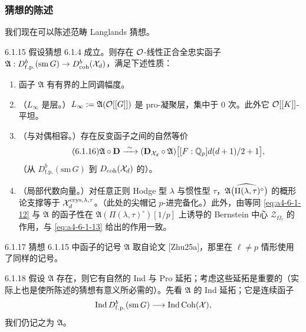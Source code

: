 \subsubsection{猜想的陈述}
我们现在可以陈述范畴 Langlands 猜想。

\begin{conj}{6.1.15}\label{thm:a4-6-1-15}
假设猜想 6.1.4 成立。则存在 $\mathcal{O}$-线性正合全忠实函子 $\mathfrak{A}:D^b_{\mathrm{f.p.}}(\mathrm{sm}\,G)\to D^b_{\mathrm{coh}}(\mathcal{X}_d)$，满足下述性质：
\begin{enumerate}[label=(\arabic*),leftmargin=2.2em,itemsep=0.15em]
\item 函子 $\mathfrak{A}$ 有有界的上同调幅度。
\item（$L_\infty$ 是层。）$L_\infty:=\mathfrak{A}(\mathcal{O}[[G]])$ 是 pro-凝聚层，集中于 $0$ 次。此外它 $\mathcal{O}[[K]]$-平坦。
\item（与对偶相容。）存在反变函子之间的自然等价
\begin{equation}\tag{6.1.16}\label{eq:a4-6-1-16}
\mathfrak{A}\circ\mathbf{D}\xrightarrow{\ \sim\ }(\mathbf{D}_{\mathcal{X}_d}\circ\mathfrak{A})\bigl[[F:\mathbb{Q}_p]d(d+1)/2+1\bigr],
\end{equation}
（从 $D^b_{\mathrm{f.p.}}(\mathrm{sm}\,G)$ 到 $D_{\mathrm{coh}}(\mathcal{X}_d)$ 的）。
\item（局部代数向量。）对任意正则 Hodge 型 $\lambda$ 与惯性型 $\tau$，$\widehat{\mathfrak{A}\bigl(\Pi(\lambda,\tau)^\circ\bigr)}$ 的概形论支撑等于 $\mathcal{X}_d^{\mathrm{crys},\lambda,\tau}$。（此处的尖帽记 $p$-进完备化。）此外，由等同 \eqref{eq:a4-6-1-12} 与 $\mathfrak{A}$ 的函子性在 $\mathfrak{A}(\Pi(\lambda,\tau)^\circ)[1/p]$ 上诱导的 Bernstein 中心 $\mathcal{Z}_{\Omega_\tau}$ 的作用，与 \eqref{eq:a4-6-1-13} 给出的作用一致。
\end{enumerate}
\end{conj}

\begin{rem}{6.1.17}\label{thm:a4-6-1-17}
猜想 6.1.15 中函子的记号 $\mathfrak{A}$ 取自论文 [Zhu25a]，那里在 $\ell\neq p$ 情形使用了同样的记号。
\end{rem}

\begin{rem}{6.1.18}\label{thm:a4-6-1-18}
假设 $\mathfrak{A}$ 存在，则它有自然的 Ind 与 Pro 延拓；考虑这些延拓是重要的（实际上也是使所陈述的猜想有意义所必需的）。先看 $\mathfrak{A}$ 的 Ind 延拓；它是连续函子
\[
\mathrm{Ind}\,D^b_{\mathrm{f.p.}}(\mathrm{sm}\,G)\longrightarrow\mathrm{Ind}\,\mathrm{Coh}(\mathcal{X}),
\]
我们仍记之为 $\mathfrak{A}$。
\end{rem}

